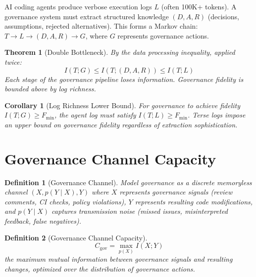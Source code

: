 \documentclass[11pt, a4paper, logo, copyright]{googledeepmind}
\newtheorem{definition}{Definition}[section]
\newtheorem{theorem}{Theorem}[section]
\newtheorem{corollary}{Corollary}[section]
\begin{document}
AI coding agents produce verbose execution logs $L$ (often 100K+ tokens). A governance system must extract structured knowledge $(D, A, R)$ (decisions, assumptions, rejected alternatives). This forms a Markov chain: $T \to L \to (D, A, R) \to G$, where $G$ represents governance actions.

\begin{theorem}[Double Bottleneck]
\label{thm:bottleneck}
By the data processing inequality, applied twice:
\begin{equation}
    I(T; G) \leq I(T; (D, A, R)) \leq I(T; L)
\end{equation}
Each stage of the governance pipeline loses information. Governance fidelity is bounded above by log richness.
\end{theorem}

\begin{corollary}[Log Richness Lower Bound]
For governance to achieve fidelity $I(T; G) \geq F_{\min}$, the agent log must satisfy $I(T; L) \geq F_{\min}$. Terse logs impose an upper bound on governance fidelity regardless of extraction sophistication.
\end{corollary}


\section{Governance Channel Capacity}
\label{sec:capacity}

\begin{definition}[Governance Channel]
Model governance as a discrete memoryless channel $(X, p(Y \mid X), Y)$ where $X$ represents governance signals (review comments, CI checks, policy violations), $Y$ represents resulting code modifications, and $p(Y \mid X)$ captures transmission noise (missed issues, misinterpreted feedback, false negatives).
\end{definition}

\begin{definition}[Governance Channel Capacity]
\begin{equation}
    C_{\mathrm{gov}} = \max_{p(X)} I(X; Y)
\end{equation}
the maximum mutual information between governance signals and resulting changes, optimized over the distribution of governance actions.
\end{definition}
\end{document}
